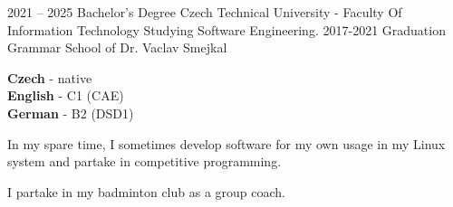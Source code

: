 \documentclass[9pt]{developercv} %
\begin{document}

\begin{entrylist}
	\entry
		{2021 -- 2025}
		{Bachelor's Degree}
		{Czech Technical University - Faculty Of Information Technology}
		{Studying Software Engineering.}
	\entry
		{2017-2021}
		{Graduation}
		{Grammar School of Dr. Vaclav Smejkal}
		{}
\end{entrylist}


\begin{minipage}[t]{0.3\textwidth}
	\vspace{-\baselineskip} %

	
	\textbf{Czech} - native\\
	\textbf{English} - C1 (CAE)\\
	\textbf{German} - B2 (DSD1)
\end{minipage}
\hfill
\begin{minipage}[t]{0.3\textwidth}
	\vspace{-\baselineskip} %
	
	
	In my spare time, I sometimes develop software for my own usage in my Linux system and partake in competitive programming.
\end{minipage}
\hfill
\begin{minipage}[t]{0.3\textwidth}
	\vspace{-\baselineskip} %
	
	
	I partake in my badminton club as a group coach.
\end{minipage}

\end{document}
